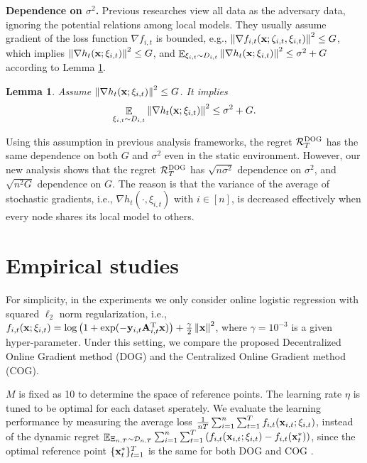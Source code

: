 \documentclass{article}
\newtheorem{Lemma}{\bf{Lemma}}
\begin{document}
\textbf{Dependence on $\sigma^2$.} Previous researches \citep{8015179Shahram,pmlr-v70-zhang17g,tcns-7353155} view all data as the adversary data, ignoring the potential relations among local models. They usually assume gradient of the loss function $\nabla f_{i,t}$ is bounded, e.g., $\left\lVert\nabla f_{i,t}({\bf x};\zeta_{i,t},\xi_{i,t})\right\rVert^2 \le G$, which implies $\left\lVert\nabla h_t({\bf x};\xi_{i,t})\right\rVert^2 \le G$, and $\mathop{\mathbb{E}}_{ \xi_{i,t} \sim D_{i,t} }\left\lVert\nabla h_t({\bf x};\xi_{i,t})\right\rVert^2  \le  \sigma^2 + G$ according to Lemma \ref{Lemma_assumption_discussion}.  
\begin{Lemma}
\label{Lemma_assumption_discussion}
Assume $\left\lVert\nabla h_t({\bf x};\xi_{i,t})\right\rVert^2 \le G$. It implies
\begin{align}
\nonumber
\mathop{\mathbb{E}}_{ \xi_{i,t} \sim D_{i,t} }\left\lVert\nabla h_t({\bf x};\xi_{i,t})\right\rVert^2  \le  \sigma^2 + G.
\end{align}
\end{Lemma} Using this assumption in previous analysis frameworks, the regret ${\mathcal{R}}_T^{\textsc{DOG}}$ has the same dependence on both $G$ and $\sigma^2$ even in the static environment. However, our  new analysis shows that the regret ${\mathcal{R}}_T^{\textsc{DOG}}$ has  $\sqrt{n\sigma^2}$ dependence on $\sigma^2$, and $\sqrt{n^2 G}$ dependence on $G$. The reason is that the variance of the average of stochastic gradients, i.e., $\nabla h_t(\cdot, \xi_{i,t})$ with $i\in[n]$, is decreased effectively when every node shares its local model to others. 

 














\section{Empirical studies}


For simplicity, in the experiments we only consider online logistic regression with squared $\ell_2$ norm regularization, i.e., $f_{i,t}({\bf x};\xi_{i,t}) = \log\left( 1+\exp(-{\bf y}_{i,t}{\bf A}_{i,t}^{\rm T} {\bf x}) \right) + \frac{\gamma}{2}\left\lVert{\bf x}\right\rVert^2$, where $\gamma = 10^{-3}$ is a given hyper-parameter. Under this setting, we compare the proposed Decentralized Online Gradient method (DOG) and the Centralized Online Gradient method (COG). 

$M$ is fixed as 10 to determine the space of reference points. The learning rate $\eta$ is tuned to be optimal for each dataset sperately. We evaluate the learning performance by measuring the average loss $\frac{1}{nT}\sum_{i=1}^n\sum_{t=1}^T f_{i,t}({\bf x}_{i,t};\xi_{i,t})$, instead of the dynamic regret $\mathop{\mathbb{E}}_{\Xi_{n,T}\sim \mathcal{D}_{n,T}}\sum_{i=1}^n\sum_{t=1}^T \left(  f_{i,t}({\bf x}_{i,t};\xi_{i,t}) - f_{i,t}({\bf x}_t^{\ast})  \right)$, since the optimal reference point $\{{\bf x}_t^\ast\}^T_{t=1}$ is the same for both DOG and COG .  
\end{document}

